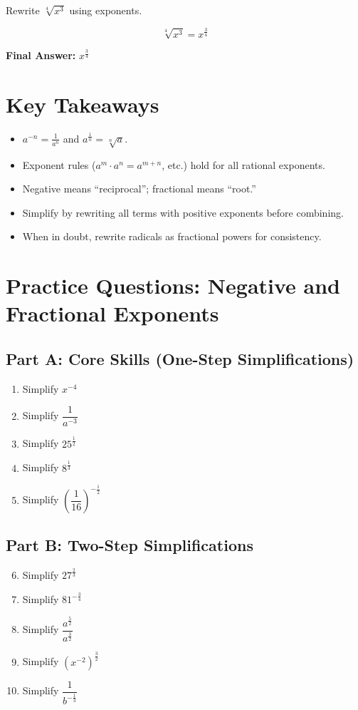 \documentclass[14pt]{extarticle}
\begin{document}
Rewrite \(\sqrt[4]{x^3}\) using exponents.

\[
\sqrt[4]{x^3} = x^{\frac{3}{4}}
\]

\textbf{Final Answer:} \(\boxed{x^{\frac{3}{4}}}\)

\section*{Key Takeaways}
\begin{itemize}
  \item \(a^{-n} = \frac{1}{a^n}\) and \(a^{\frac{1}{n}} = \sqrt[n]{a}\).
  \item Exponent rules (\(a^m \cdot a^n = a^{m+n}\), etc.) hold for all rational exponents.
  \item Negative means “reciprocal”; fractional means “root.”
  \item Simplify by rewriting all terms with positive exponents before combining.
  \item When in doubt, rewrite radicals as fractional powers for consistency.
\end{itemize}

\newpage


\section*{Practice Questions: Negative and Fractional Exponents}

\subsection*{Part A: Core Skills (One-Step Simplifications)}
\begin{enumerate}
  \item Simplify \(x^{-4}\)
  \item Simplify \(\dfrac{1}{a^{-3}}\)
  \item Simplify \(25^{\frac{1}{2}}\)
  \item Simplify \(8^{\frac{1}{3}}\)
  \item Simplify \(\left(\dfrac{1}{16}\right)^{-\frac{1}{2}}\)
\end{enumerate}

\subsection*{Part B: Two-Step Simplifications}
\begin{enumerate}
  \setcounter{enumi}{5}
  \item Simplify \(27^{\frac{2}{3}}\)
  \item Simplify \(81^{-\frac{3}{4}}\)
  \item Simplify \(\dfrac{a^{\frac{5}{2}}}{a^{\frac{3}{2}}}\)
  \item Simplify \((x^{-2})^{\frac{3}{2}}\)
  \item Simplify \(\dfrac{1}{b^{-\frac{1}{3}}}\)
\end{enumerate}
\end{document}
